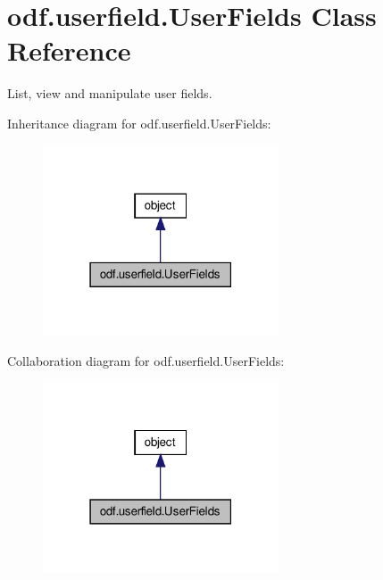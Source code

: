 \hypertarget{classodf_1_1userfield_1_1UserFields}{\section{odf.\+userfield.\+User\+Fields Class Reference}
\label{classodf_1_1userfield_1_1UserFields}
}


List, view and manipulate user fields.  




Inheritance diagram for odf.\+userfield.\+User\+Fields\+:
\nopagebreak
\begin{figure}[H]
\begin{center}
\leavevmode
\includegraphics[width=198pt]{classodf_1_1userfield_1_1UserFields__inherit__graph}
\end{center}
\end{figure}


Collaboration diagram for odf.\+userfield.\+User\+Fields\+:
\nopagebreak
\begin{figure}[H]
\begin{center}
\leavevmode
\includegraphics[width=198pt]{classodf_1_1userfield_1_1UserFields__coll__graph}
\end{center}
\end{figure}
